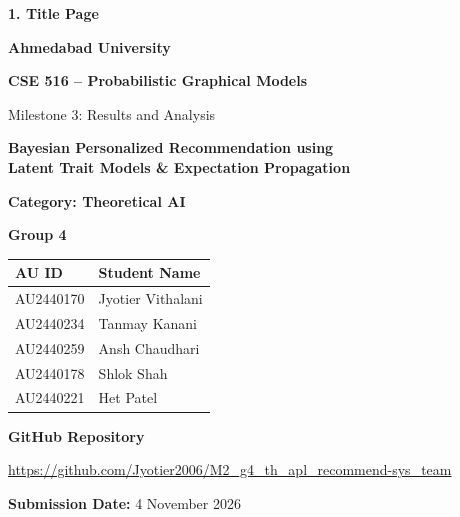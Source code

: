 \documentclass[12pt,a4paper]{article}
\begin{document}
\begin{titlepage}
\thispagestyle{empty}
{\large\bfseries 1. Title Page}\par
\vspace{17mm}
\begin{center}
{\Large\bfseries Ahmedabad University}\par
\vspace{3mm}
{\Large\bfseries CSE 516 -- Probabilistic Graphical Models}\par
\vspace{5mm}
{\large Milestone 3: Results and Analysis}\par
\vspace{15mm}
{\fontsize{18}{22}\selectfont\bfseries Bayesian Personalized Recommendation using\\[3pt]
Latent Trait Models \& Expectation Propagation}\par
\vspace{5mm}
{\large\bfseries Category: Theoretical AI}\par
\vspace{2mm}
{\large\bfseries Group 4}\par
\vspace{10mm}
\renewcommand{\arraystretch}{1.18}
\begin{tabular}{ll}\toprule
\textbf{AU ID} & \textbf{Student Name}\\\midrule
AU2440170 & Jyotier Vithalani\\
AU2440234 & Tanmay Kanani\\
AU2440259 & Ansh Chaudhari\\
AU2440178 & Shlok Shah\\
AU2440221 & Het Patel\\\bottomrule
\end{tabular}
\vfill
\textbf{GitHub Repository}\par
\vspace{2mm}
{\small\url{https://github.com/Jyotier2006/M2_g4_th_apl_recommend-sys_team}}\par
\vspace{10mm}
\textbf{Submission Date:} 4 November 2026\par
\vspace{4mm}
\end{center}
\end{titlepage}
\setcounter{page}{1}
\setcounter{section}{1}
\end{document}
